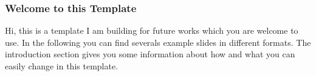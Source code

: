 
\begin{frame}
    \frametitle{Welcome to this Template}
    Hi, this is a template I am building for future works which you are welcome to use. In the following you can find severals example slides in different formats. The introduction section gives you some information about how and what you can easily change in this template.
\end{frame}